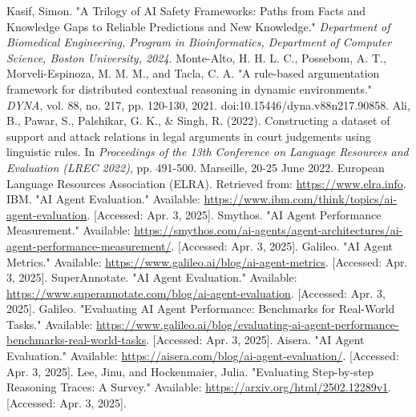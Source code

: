 \documentclass[conference]{IEEEtran}
\begin{document}
\begin{thebibliography}{00}
     Kasif, Simon. "A Trilogy of AI Safety Frameworks: Paths from Facts and Knowledge Gaps to Reliable Predictions and New Knowledge." \textit{Department of Biomedical Engineering, Program in Bioinformatics, Department of Computer Science, Boston University, 2024}.
     Monte-Alto, H. H. L. C., Possebom, A. T., Morveli-Espinoza, M. M. M., and Tacla, C. A. "A rule-based argumentation framework for distributed contextual reasoning in dynamic environments." \textit{DYNA}, vol. 88, no. 217, pp. 120-130, 2021. doi:10.15446/dyna.v88n217.90858.
     Ali, B., Pawar, S., Palshikar, G. K., \& Singh, R. (2022). Constructing a dataset of support and attack relations in legal arguments in court judgements using linguistic rules. In \textit{Proceedings of the 13th Conference on Language Resources and Evaluation (LREC 2022)}, pp. 491-500. Marseille, 20-25 June 2022. European Language Resources Association (ELRA). Retrieved from: \url{https://www.elra.info}.
     IBM. "AI Agent Evaluation." Available: \url{https://www.ibm.com/think/topics/ai-agent-evaluation}. [Accessed: Apr. 3, 2025].
     Smythos. "AI Agent Performance Measurement." Available: \url{https://smythos.com/ai-agents/agent-architectures/ai-agent-performance-measurement/}. [Accessed: Apr. 3, 2025].
     Galileo. "AI Agent Metrics." Available: \url{https://www.galileo.ai/blog/ai-agent-metrics}. [Accessed: Apr. 3, 2025].
     SuperAnnotate. "AI Agent Evaluation." Available: \url{https://www.superannotate.com/blog/ai-agent-evaluation}. [Accessed: Apr. 3, 2025].
     Galileo. "Evaluating AI Agent Performance: Benchmarks for Real-World Tasks." Available: \url{https://www.galileo.ai/blog/evaluating-ai-agent-performance-benchmarks-real-world-tasks}. [Accessed: Apr. 3, 2025].
     Aisera. "AI Agent Evaluation." Available: \url{https://aisera.com/blog/ai-agent-evaluation/}. [Accessed: Apr. 3, 2025].
     Lee, Jinu, and Hockenmaier, Julia. "Evaluating Step-by-step Reasoning Traces: A Survey." Available: \url{https://arxiv.org/html/2502.12289v1}. [Accessed: Apr. 3, 2025].
\end{thebibliography}
    
\end{document}
